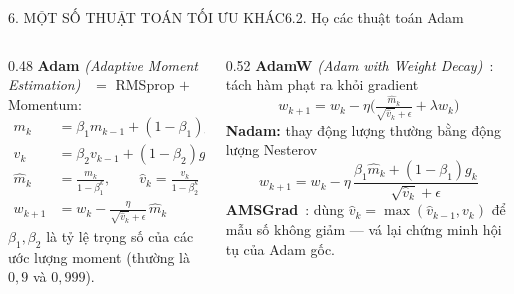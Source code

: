 \documentclass[aspectratio=169,11pt]{beamer}
\begin{document}
\begin{frame}{6. MỘT SỐ THUẬT TOÁN TỐI ƯU KHÁC}{6.2. Họ các thuật toán Adam}
  \footnotesize
  \begin{columns}[T]
    \begin{column}{0.48\textwidth}
      \textbf{Adam} \textit{(Adaptive Moment Estimation)}~\cite{kingma2015adam} $=$ RMSprop $+$ Momentum:
      \begin{align*}
        m_k&=\beta_1 m_{k-1}+(1-\beta_1)g_k\\
        v_k&=\beta_2 v_{k-1}+(1-\beta_2)g_k^2\\
        \hat m_k&=\frac{m_k}{1-\beta_1^k},\qquad \hat v_k=\frac{v_k}{1-\beta_2^k}\\
        w_{k+1}&=w_k-\frac{\eta}{\sqrt{\hat v_k}+\epsilon}\,\hat m_k
      \end{align*}
      $\beta_1,\beta_2$ là tỷ lệ trọng số của các ước lượng moment (thường là $0{,}9$ và $0{,}999$).
    \end{column}
    \begin{column}{0.52\textwidth}
      \textbf{AdamW} \textit{(Adam with Weight Decay)}~\cite{loshchilov2019adamw}: tách hàm phạt ra khỏi gradient
      \[
        w_{k+1}=w_k-\eta\Big(\tfrac{\hat m_k}{\sqrt{\hat v_k}+\epsilon}+\lambda w_k\Big)
      \]
      \textbf{Nadam:} thay động lượng thường bằng động lượng Nesterov
      \[
        w_{k+1}=w_k-\eta\,\frac{\beta_1\hat m_k+(1-\beta_1)g_k}{\sqrt{\hat v_k}+\epsilon}
      \]
      \textbf{AMSGrad}~\cite{reddi2018amsgrad}: dùng $\hat v_k=\max(\hat v_{k-1},v_k)$ để mẫu số không giảm —
      vá lại chứng minh hội tụ của Adam gốc.
    \end{column}
  \end{columns}
\end{frame}
\end{document}
